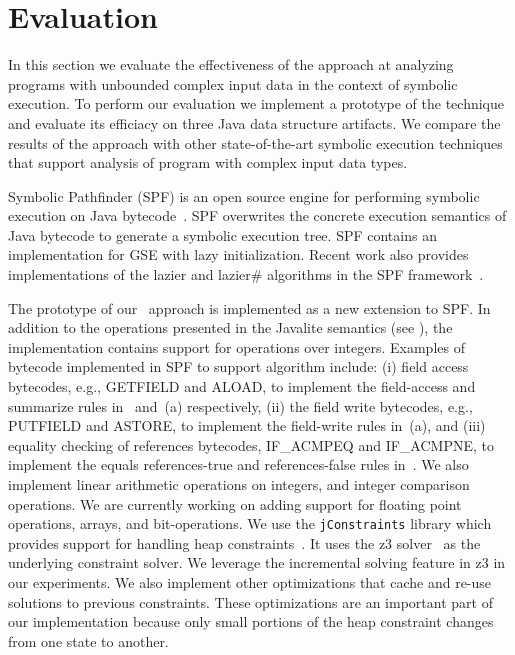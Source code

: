 

\section{Evaluation}
\label{sec:eval}
In this section we evaluate the effectiveness of the \symtxt{}
approach at analyzing programs with unbounded complex input data in
the context of symbolic execution. To perform our evaluation
we implement a prototype of the \symtxt{} technique and evaluate its efficiacy on
three Java data structure artifacts. We compare the results of the
\symtxt{} approach with other state-of-the-art symbolic execution techniques 
that support analysis of program with complex input data types. 

Symbolic Pathfinder (SPF) is an open source engine for performing symbolic 
execution on Java 
bytecode~\cite{visser:ase03,Pasareanu:ISSTA08,pasareanu:ase10,DBLP:journals/ase/PasareanuVBGMR13}.
SPF overwrites the concrete execution semantics of Java
bytecode to generate a symbolic execution tree. SPF contains an
implementation for GSE with lazy initialization. Recent work also
provides implementations of the lazier and lazier\# algorithms in the
SPF framework~\cite{Hillery:2014}.


The prototype of  our~\symtxt{} approach is implemented as a new extension to SPF.
In addition to the operations presented in the Javalite
semantics (see ), the implementation contains 
support for operations over
integers. Examples of bytecode implemented in SPF to support \symtxt{} 
algorithm include:
(i) field access bytecodes, e.g., GETFIELD and ALOAD, to implement the 
field-access and summarize rules
in~ and~(a) respectively, (ii) the field
write bytecodes, e.g., PUTFIELD and ASTORE, to implement the
field-write rules in~(a), and (iii) equality checking of
references bytecodes, IF\_ACMPEQ and IF\_ACMPNE, to implement the
equals references-true and references-false rules in~.
We also implement linear arithmetic operations on integers, and integer
comparison operations. We are currently working on adding support for
floating point operations, arrays, and bit-operations.  We use the
\texttt{jConstraints} library which provides support for handling heap
constraints~\cite{ase2014-ghilrr,jpf2014-dghirr}. It uses the z3
solver~\cite{deMouraBjorner08Z3} as the underlying constraint solver. We
leverage the incremental solving feature in z3 in our experiments. We
also implement other optimizations that cache and re-use solutions to
previous constraints. These optimizations are an important part of our
implementation because only small portions of the heap constraint
changes from one state to another.


